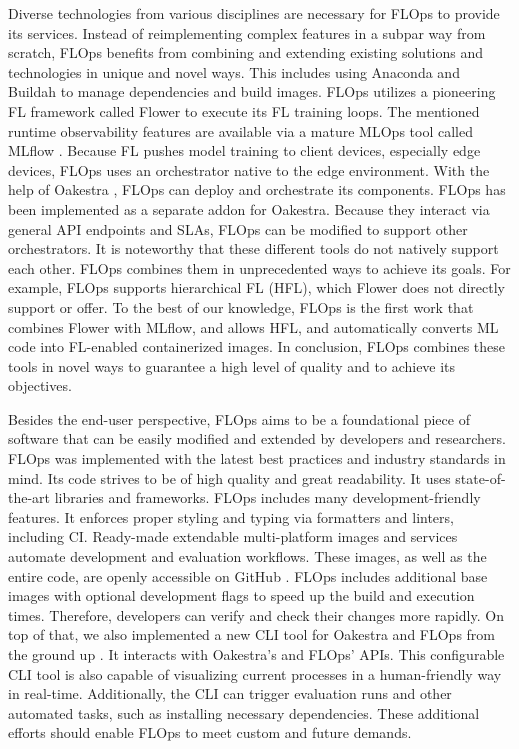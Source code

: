 Diverse technologies from various disciplines are necessary for FLOps to provide its services.
Instead of reimplementing complex features in a subpar way from scratch, FLOps benefits from combining and extending existing solutions and technologies in unique and novel ways.
This includes using Anaconda \cite{anaconda_docs} and Buildah \cite{buildah_homepage} to manage dependencies and build images.
FLOps utilizes a pioneering FL framework called Flower \cite{flower_docs} to execute its FL training loops.
The mentioned runtime observability features are available via a mature MLOps tool called MLflow \cite{mlflow_docs}.
Because FL pushes model training to client devices, especially edge devices, FLOps uses an orchestrator native to the edge environment.
With the help of Oakestra \cite{paper:oakestra_usenix}, FLOps can deploy and orchestrate its components.
FLOps has been implemented as a separate addon for Oakestra.
Because they interact via general API endpoints and SLAs, FLOps can be modified to support other orchestrators.
It is noteworthy that these different tools do not natively support each other.
FLOps combines them in unprecedented ways to achieve its goals.
For example, FLOps supports hierarchical FL (HFL), which Flower does not directly support or offer.
To the best of our knowledge, FLOps is the first work that combines Flower with MLflow, and allows HFL, and automatically converts ML code into FL-enabled containerized images.
In conclusion, FLOps combines these tools in novel ways to guarantee a high level of quality and to achieve its objectives.

Besides the end-user perspective, FLOps aims to be a foundational piece of software that can be easily modified and extended by developers and researchers.
FLOps was implemented with the latest best practices and industry standards in mind.
Its code strives to be of high quality and great readability.
It uses state-of-the-art libraries and frameworks.
FLOps includes many development-friendly features.
It enforces proper styling and typing via formatters and linters, including CI.
Ready-made extendable multi-platform images and services automate development and evaluation workflows.
These images, as well as the entire code, are openly accessible on GitHub \cite{flops_code}.
FLOps includes additional base images with optional development flags to speed up the build and execution times.
Therefore, developers can verify and check their changes more rapidly.
On top of that, we also implemented a new CLI tool for Oakestra and FLOps from the ground up \cite{cli_code}.
It interacts with Oakestra's and FLOps' APIs.
This configurable CLI tool is also capable of visualizing current processes in a human-friendly way in real-time.
Additionally, the CLI can trigger evaluation runs and other automated tasks, such as installing necessary dependencies.
These additional efforts should enable FLOps to meet custom and future demands.